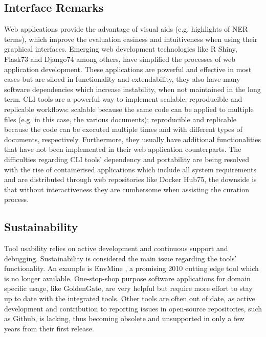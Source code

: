    \subsection{Interface Remarks}
   Web applications provide the advantage of visual aids (e.g. highlights of NER terms), which improve the evaluation easiness and intuitiveness when using their graphical interfaces. Emerging web development technologies like R Shiny, Flask73 and Django74 among others, have simplified the processes of web application development. These applications are powerful and effective in most cases but are siloed in functionality and extendability, they also have many software dependencies which increase instability, when not maintained in the long term.
CLI tools are a powerful way to implement scalable, reproducible and replicable workflows: scalable because the same code can be applied to multiple files (e.g. in this case, the various documents); reproducible and replicable because the code can be executed multiple times and with different types of documents, respectively. Furthermore, they usually have additional functionalities that have not been implemented in their web application counterparts. The difficulties regarding CLI tools’ dependency and portability are being resolved with the rise of containerised applications which include all system requirements and are distributed through web repositories like Docker Hub75, the downside is that without interactiveness they are cumbersome when assisting the curation process.

   \subsection{Sustainability}
   Tool usability relies on active development and continuous support and
debugging. Sustainability is considered the main issue regarding the tools’
functionality. An example is EnvMine \citep{tamames_envmine_2010}, a promising
2010 cutting edge tool which is no longer available. One-stop-shop purpose
software applications for domain specific usage, like GoldenGate, are very
helpful but require more effort to stay up to date with the integrated tools.
Other tools are often out of date, as active development and contribution to
reporting issues in open-source repositories, such as Github, is lacking, thus
becoming obsolete and unsupported in only a few years from their first release.

